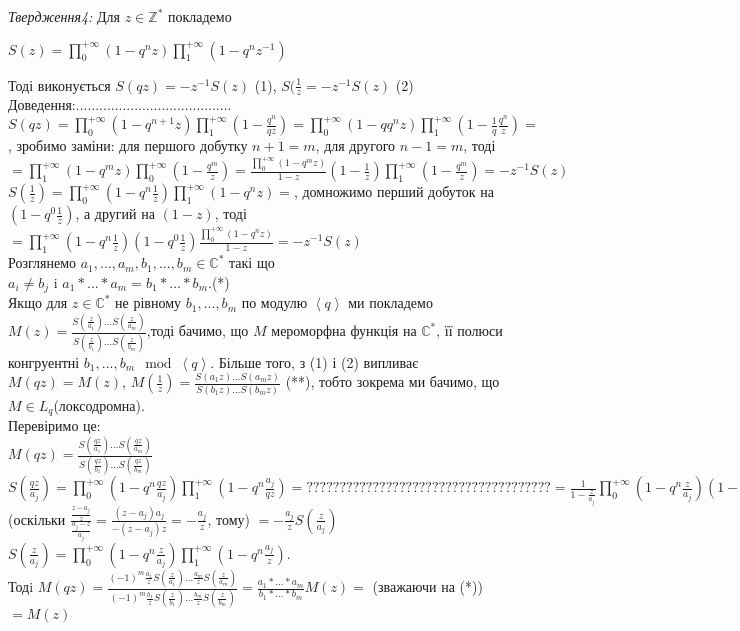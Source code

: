 \documentclass[12pt,a4paper]{article}
\begin{document}
\emph{Твердження4:} Для $z \in \mathbb{Z}^{*}$ покладемо
  \begin{center}
	$S(z)= \prod_{0}^{+\infty } ( 1-q^{n}z ) \prod_{1}^{+\infty }( 1-q^{n}z^{-1} )$
  \end{center} Тоді виконується $S(qz)=-z^{-1}S(z)$ (1), $S(\frac{1}{z}=-z^{-1}S(z)$ (2)\\
Доведення:........................................\\
$S(qz)= \prod_{0}^{+\infty } ( 1-q^{n+1}z ) \prod_{1}^{+\infty }( 1-\frac{q^{n}}{qz})=
 \prod_{0}^{+\infty } ( 1-qq^{n}z ) \prod_{1}^{+\infty }( 1-\frac{1}{q}\frac{q^{n}}{z})=$, зробимо заміни: для першого добутку $n+1=m$, для другого $n-1=m$, тоді $=\prod_{1}^{+\infty } ( 1-q^{m}z ) \prod_{0}^{+\infty }( 1-\frac{q^{m}}{z})=\frac{\prod_{0}^{+\infty } ( 1-q^{m}z )}{1-z}(1-\frac{1}{z})\prod_{1}^{+\infty }( 1-\frac{q^{m}}{z})=-z^{-1}S(z)$ \\
 $S(\frac{1}{z})= \prod_{0}^{+\infty } ( 1-q^{n}\frac{1}{z} ) \prod_{1}^{+\infty }( 1-q^{n}z)=$, домножимо перший добуток на $(1-q^{0}\frac{1}{z})$, а другий на $(1-z)$, тоді $=\prod_{1}^{+\infty } ( 1-q^{n}\frac{1}{z} )(1-q^{0}\frac{1}{z})\frac{ \prod_{0}^{+\infty }( 1-q^{n}z)}{1-z}=-z^{-1}S(z)$\\
 
Розглянемо $a_{1},...,a_{m},b_{1},...,b_{m}\in \mathbb{C}^{*}$ такі що\\
 $a_{i}\neq b_{j}$ i $a_{1}*...*a_{m}=b_{1}*...*b_{m}$.(*)\\

Якщо для $z \in \mathbb{C}^{*}$ не рівному $b_{1},...,b_{m}$ по модулю $\left \langle q \right \rangle $ ми покладемо $M(z)=\frac{S(\frac{z}{a_{1}})...S(\frac{z}{a_{m}})}{S(\frac{z}{b_{1}})...S(\frac{z}{b_{m}})}$,тоді бачимо, що $M$ мероморфна функція на $\mathbb{C}^{*}$, її полюси конгруентні $b_{1},...,b_{m}\mod \left \langle q \right \rangle $. Більше того, з (1) і (2) випливає $M(qz)=M(z)$, $M(\frac{1}{z})=\frac{S(a_{1}z)...S(a_{m}z)}{S(b_{1}z)...S(b_{m}z)}$ (**), тобто зокрема ми бачимо, що $M\in L_{q}$(локсодромна).\\
Перевіримо це:\\
$M(qz)=\frac{S(\frac{qz}{a_{1}})...S(\frac{qz}{a_{m}})}{S(\frac{qz}{b_{1}})...S(\frac{qz}{b_{m}})}$\\
$S(\frac{qz}{a_{j}})= \prod_{0}^{+\infty } ( 1-q^{n}\frac{qz}{a_{j}} ) \prod_{1}^{+\infty }( 1-q^{n}\frac{a_{j}}{qz}) =?????????????????????????????????????= \frac{1}{1-\frac{z}{a_{j}}} \prod_{0}^{+\infty } ( 1-q^{n}\frac{z}{a_{j}}) (1-\frac{a_{j}}{z}) \prod_{1}^{+\infty }( 1-q^{n}\frac{a_{j}}{z})=$
(оскільки $ \frac{\frac{z-a_{j}}{z}}{\frac{a_{j}-z}{a_{j}}}= \frac{(z-a_{j})a_{j}}{-(z-a_{j})z}=-\frac{a_{j}}{z} $, тому)
$=-\frac{a_{j}}{z}S(\frac{z}{a_{j}})$\\
$S(\frac{z}{a_{j}})=  \prod_{0}^{+\infty } ( 1-q^{n}\frac{z}{a_{j}} ) \prod_{1}^{+\infty }( 1-q^{n}\frac{a_{j}}{z})$.\\
 Тодi
$M(qz)=\frac{ (-1)^{m} \frac{a_{1}}{z} S(\frac{z}{a_{1}})...\frac{a_{m}}{z} S(\frac{z}{a_{m}}) }{ (-1)^{m} \frac{b_{1}}{z} S(\frac{z}{b_{1}})...\frac{b_{m}}{z} S(\frac{z}{b_{m}}) }=\frac{ a_{1}*...*a_{m}}{b_{1}*...*b_{m}}M(z)=$ (зважаючи на (*)) $=M(z)$\\
\end{document}
